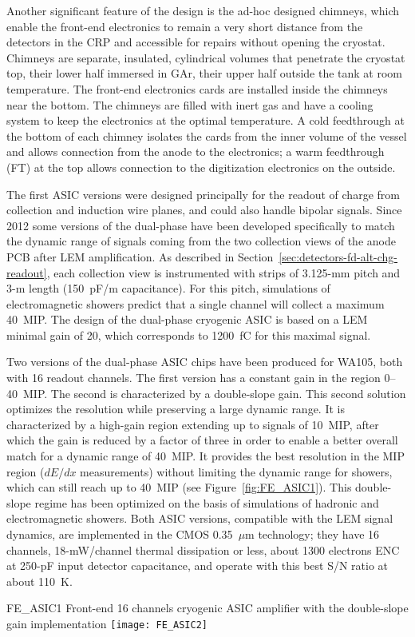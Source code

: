 Another significant feature of the design is the ad-hoc designed chimneys, which 
enable the front-end electronics to remain a very short
distance from the detectors in the CRP and accessible for repairs without
opening the cryostat.
Chimneys are
separate, insulated, cylindrical volumes that penetrate the cryostat top, 
their lower half immersed in GAr, their upper half outside the tank at room temperature.
The front-end electronics cards are installed inside the chimneys near the bottom. 
The chimneys are filled with inert gas and have a cooling
system to keep the electronics at the optimal temperature.  A cold feedthrough at
the bottom of each chimney isolates the cards from the inner volume of the
vessel and allows connection from the anode to the electronics;
a warm feedthrough (FT) at the top allows connection to the digitization electronics 
on the outside.

The first ASIC versions were designed principally for the readout of
charge from collection and induction wire planes, and could also handle
bipolar signals. Since 2012 some versions of the dual-phase
have been developed specifically to match the dynamic range of signals
coming from the two collection views of the anode PCB after LEM
amplification. As described in Section~\ref{sec:detectors-fd-alt-chg-readout},  
each collection view is instrumented
with strips of 3.125-mm pitch and 3-m length (150~pF/m capacitance).
For this pitch, simulations of electromagnetic showers predict that a single channel
will collect a maximum 40~MIP. The design of the dual-phase cryogenic ASIC
is based on a LEM minimal gain of 20, which corresponds to
1200~fC for this maximal signal.


Two versions of the dual-phase ASIC chips have been produced
for WA105, both with 16 readout channels. The first version has a
constant gain in the region 0--40~MIP. The second is
characterized by a double-slope gain. This second solution optimizes the
resolution while preserving a large dynamic range. It is characterized
by a high-gain region extending up to signals of 10~MIP, after which the
gain is reduced by a factor of three in order to enable a better overall match for a dynamic
range of 40~MIP.  It provides the best resolution in the MIP
region ($dE/dx$ measurements) without limiting the dynamic range for
showers, which can still reach up to 40~MIP (see
Figure~\ref{fig:FE_ASIC1}). This double-slope regime has been
optimized on the basis of simulations of hadronic and electromagnetic
showers. Both ASIC versions, compatible with the LEM signal dynamics,
are implemented in the CMOS 0.35~$\mu$m technology; they have 16 channels,
18-mW/channel thermal dissipation or less, about 1300 electrons ENC at
250-pF input detector capacitance, and operate with this best S/N ratio at about 110~K.
\begin{cdrfigure}{FE_ASIC1} 
{Front-end 16 channels cryogenic ASIC amplifier with the double-slope gain implementation}
\texttt{[image: FE\_ASIC2]}
\end{cdrfigure}

